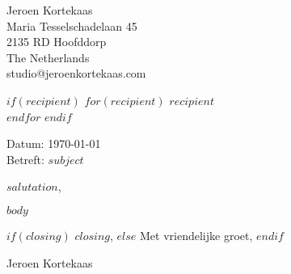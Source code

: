 \documentclass[10pt,a4paper]{article}
\begin{document}
\fontsize{9}{15}\selectfont

\noindent
\hfill
\begin{minipage}[t]{0.5\textwidth}
\raggedleft
{\fontsize{11}{16}\selectfont Jeroen Kortekaas} \\
Maria Tesselschadelaan 45 \\
2135 RD Hoofddorp \\
The Netherlands \\
studio@jeroenkortekaas.com \\
\end{minipage}

\vspace{1.5em}

\begin{adjustwidth}{15mm}{15mm}

$if(recipient)$
{\fontsize{11}{16}\selectfont
$for(recipient)$
$recipient$ \\ 
$endfor$
}
$endif$


\vspace{1.5em}

Datum: \today \\
Betreft: $subject$ \\

\vspace{1.5em}

$salutation$,

$body$

\vspace{2em}

$if(closing)$
$closing$,
$else$
Met vriendelijke groet,
$endif$

\vspace{3em}

Jeroen Kortekaas

\end{adjustwidth}
\end{document}
